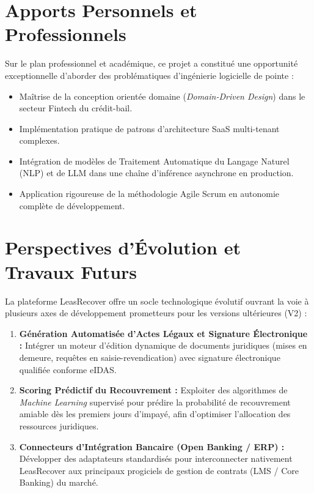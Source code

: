 \section*{Apports Personnels et Professionnels}

Sur le plan professionnel et académique, ce projet a constitué une opportunité exceptionnelle d'aborder des problématiques d'ingénierie logicielle de pointe :
\begin{itemize}
    \item Maîtrise de la conception orientée domaine (\textit{Domain-Driven Design}) dans le secteur Fintech du crédit-bail.
    \item Implémentation pratique de patrons d'architecture SaaS multi-tenant complexes.
    \item Intégration de modèles de Traitement Automatique du Langage Naturel (NLP) et de LLM dans une chaîne d'inférence asynchrone en production.
    \item Application rigoureuse de la méthodologie Agile Scrum en autonomie complète de développement.
\end{itemize}

\section*{Perspectives d'Évolution et Travaux Futurs}

La plateforme LeasRecover offre un socle technologique évolutif ouvrant la voie à plusieurs axes de développement prometteurs pour les versions ultérieures (V2) :

\begin{enumerate}
    \item \textbf{Génération Automatisée d'Actes Légaux et Signature Électronique :} Intégrer un moteur d'édition dynamique de documents juridiques (mises en demeure, requêtes en saisie-revendication) avec signature électronique qualifiée conforme eIDAS.
    \item \textbf{Scoring Prédictif du Recouvrement :} Exploiter des algorithmes de \textit{Machine Learning} supervisé pour prédire la probabilité de recouvrement amiable dès les premiers jours d'impayé, afin d'optimiser l'allocation des ressources juridiques.
    \item \textbf{Connecteurs d'Intégration Bancaire (Open Banking / ERP) :} Développer des adaptateurs standardisés pour interconnecter nativement LeasRecover aux principaux progiciels de gestion de contrats (LMS / Core Banking) du marché.
\end{enumerate}
